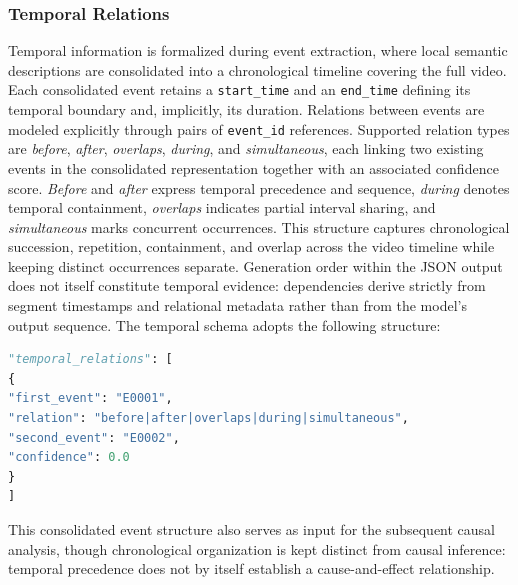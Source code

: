 \subsubsection*{Temporal Relations}
Temporal information is formalized during event extraction, where local semantic descriptions are consolidated into a chronological timeline covering the full video. Each consolidated event retains a \texttt{start\_time} and an \texttt{end\_time} defining its temporal boundary and, implicitly, its duration.
Relations between events are modeled explicitly through pairs of \texttt{event\_id} references. Supported relation types are \textit{before}, \textit{after}, \textit{overlaps}, \textit{during}, and \textit{simultaneous}, each linking two existing events in the consolidated representation together with an associated confidence score. \textit{Before} and \textit{after} express temporal precedence and sequence, \textit{during} denotes temporal containment, \textit{overlaps} indicates partial interval sharing, and \textit{simultaneous} marks concurrent occurrences.
This structure captures chronological succession, repetition, containment, and overlap across the video timeline while keeping distinct occurrences separate. Generation order within the JSON output does not itself constitute temporal evidence: dependencies derive strictly from segment timestamps and relational metadata rather than from the model's output sequence.
The temporal schema adopts the following structure:
\begin{lstlisting}[language=Python]
"temporal_relations": [
{
"first_event": "E0001",
"relation": "before|after|overlaps|during|simultaneous",
"second_event": "E0002",
"confidence": 0.0
}
]
\end{lstlisting}
This consolidated event structure also serves as input for the subsequent causal analysis, though chronological organization is kept distinct from causal inference: temporal precedence does not by itself establish a cause-and-effect relationship.
